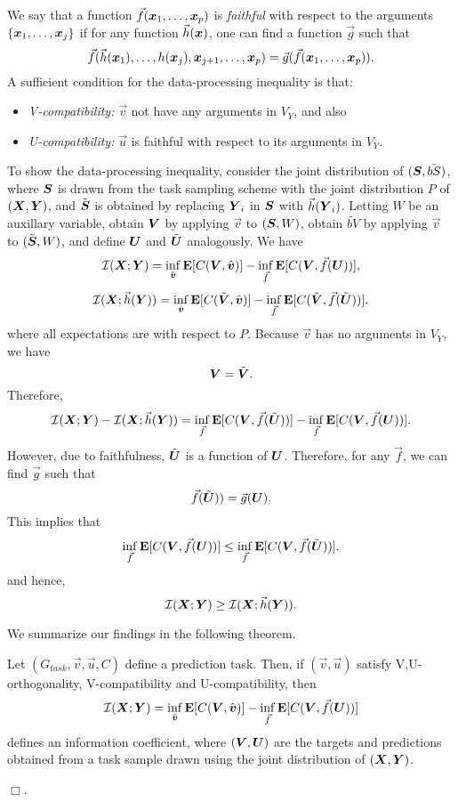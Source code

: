 \documentclass[12pt]{article}
\begin{document}
We say that a function $\vec{f}(\boldsymbol{x}_1,\hdots, \boldsymbol{x}_p)$ is \emph{faithful} with respect to the arguments $\{\boldsymbol{x}_1,\hdots, \boldsymbol{x}_j\}$
if for any function $\vec{h}(\boldsymbol{x})$, one can find a function $\vec{g}$ such that
\[
\vec{f}(\vec{h}(\boldsymbol{x}_1),\hdots, h(\boldsymbol{x}_j), \boldsymbol{x}_{j+1}, \hdots, \boldsymbol{x}_p) = \vec{g}(\vec{f}(\boldsymbol{x}_1,\hdots, \boldsymbol{x}_p)).
\]
A sufficient condition for the data-processing inequality is that:
\begin{itemize}
\item \emph{V-compatibility:} $\vec{v}$ not have any arguments in $V_Y$, and also
\item \emph{U-compatibility:} $\vec{u}$ is faithful with respect to its arguments in $V_Y$.
\end{itemize}
To show the
data-processing inequality, consider the joint distribution of
$(\boldsymbol{S}, \tilde{bS})$, where $\boldsymbol{S}$ is drawn from the task sampling
scheme with the joint distribution $P$ of $(\boldsymbol{X}, \boldsymbol{Y})$, and
$\tilde{\boldsymbol{S}}$ is obtained by replacing $\boldsymbol{Y}_i$ in $\boldsymbol{S}$ with
$\vec{h}(\boldsymbol{Y}_i)$.  Letting $W$ be an auxillary variable, obtain $\boldsymbol{V}$
by applying $\vec{v}$ to $(\boldsymbol{S}, W)$, obtain $\tilde{bV}$ by applying
$\vec{v}$ to $(\tilde{\boldsymbol{S}}, W)$, and define $\boldsymbol{U}$ and $\tilde{\boldsymbol{U}}$
analogously.  We have
\[
\mathcal{I}(\boldsymbol{X}; \boldsymbol{Y}) = \inf_{\hat{\boldsymbol{v}}} \textbf{E}[C(\boldsymbol{V}, \hat{\boldsymbol{v}})] - \inf_{\vec{f}} \textbf{E}[C(\boldsymbol{V}, \vec{f}(\boldsymbol{U}))],
\]
\[
\mathcal{I}(\boldsymbol{X}; \vec{h}(\boldsymbol{Y})) = \inf_{\hat{\boldsymbol{v}}} \textbf{E}[C(\tilde{\boldsymbol{V}}, \hat{\boldsymbol{v}})] - \inf_{\vec{f}} \textbf{E}[C(\tilde{\boldsymbol{V}}, \vec{f}(\tilde{\boldsymbol{U}}))].
\]
where all expectations are with respect to $P$.
Because $\vec{v}$ has no arguments in $V_Y$, we have
\[
\boldsymbol{V} = \tilde{\boldsymbol{V}}.
\]
Therefore,
\[
\mathcal{I}(\boldsymbol{X}; \boldsymbol{Y}) - \mathcal{I}(\boldsymbol{X}; \vec{h}(\boldsymbol{Y})) =  \inf_{\vec{f}} \textbf{E}[C(\boldsymbol{V}, \vec{f}(\tilde{\boldsymbol{U}}))] - \inf_{\vec{f}} \textbf{E}[C(\boldsymbol{V}, \vec{f}(\boldsymbol{U}))].
\]
However, due to faithfulness, $\tilde{\boldsymbol{U}}$ is a function of $\boldsymbol{U}$.  Therefore, for any $\vec{f}$, we can find $\vec{g}$ such that
\[
\vec{f}(\tilde{\boldsymbol{U}})) = \vec{g}(\boldsymbol{U}).
\]
This implies that
\[
\inf_{\vec{f}} \textbf{E}[C(\boldsymbol{V}, \vec{f}(\boldsymbol{U}))] \leq \inf_{\vec{f}} \textbf{E}[C(\boldsymbol{V}, \vec{f}(\tilde{\boldsymbol{U}}))].
\]
and hence,
\[
\mathcal{I}(\boldsymbol{X}; \boldsymbol{Y}) \geq \mathcal{I}(\boldsymbol{X}; \vec{h}(\boldsymbol{Y})).
\]

We summarize our findings in the following theorem.
\begin{theorem}
Let $(G_{task}, \vec{v}, \vec{u}, C)$ define a prediction task.  Then,
if $(\vec{v}, \vec{u})$ satisfy V,U-orthogonality, V-compatibility and
U-compatibility, then
\[
\mathcal{I}(\boldsymbol{X}; \boldsymbol{Y}) = \inf_{\hat{\boldsymbol{v}}} \textbf{E}[C(\boldsymbol{V}, \hat{\boldsymbol{v}})] - \inf_{\vec{f}} \textbf{E}[C(\boldsymbol{V}, \vec{f}(\boldsymbol{U}))]
\]
defines an information coefficient, where $(\boldsymbol{V}, \boldsymbol{U})$ are the targets
and predictions obtained from a task sample drawn using the joint
distribution of $(\boldsymbol{X}, \boldsymbol{Y})$.
\end{theorem}
$\Box$.
\end{document}
